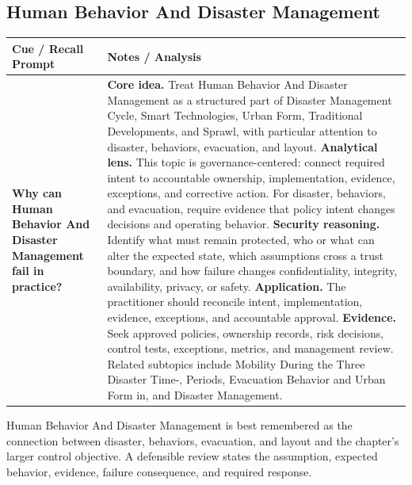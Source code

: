 \documentclass[11pt]{article}
\newcommand{\CornellHeader}{%
\rowcolor{Navy}\color{white}\bfseries Cue / Recall Prompt & \color{white}\bfseries Notes / Analysis\\\hline}
\newcommand{\CornellRow}[2]{%
\cellcolor{CueGray}\RaggedRight\textbf{#1} & \RaggedRight #2\\\hline}
\begin{document}
\subsection*{Human Behavior And Disaster Management}
\begin{longtable}{>{\RaggedRight\arraybackslash}p{}|>{\RaggedRight\arraybackslash}p{}}
\CornellHeader
\CornellRow{Why can Human Behavior And Disaster Management fail in practice?}{\textbf{Core idea.} Treat Human Behavior And Disaster Management as a structured part of Disaster Management Cycle, Smart Technologies, Urban Form, Traditional Developments, and Sprawl, with particular attention to disaster, behaviors, evacuation, and layout. \textbf{Analytical lens.} This topic is governance-centered: connect required intent to accountable ownership, implementation, evidence, exceptions, and corrective action. For disaster, behaviors, and evacuation, require evidence that policy intent changes decisions and operating behavior. \textbf{Security reasoning.} Identify what must remain protected, who or what can alter the expected state, which assumptions cross a trust boundary, and how failure changes confidentiality, integrity, availability, privacy, or safety. \textbf{Application.} The practitioner should reconcile intent, implementation, evidence, exceptions, and accountable approval. \textbf{Evidence.} Seek approved policies, ownership records, risk decisions, control tests, exceptions, metrics, and management review. Related subtopics include Mobility During the Three Disaster Time-, Periods, Evacuation Behavior and Urban Form in, and Disaster Management.}
\end{longtable}
\begin{topicsummary}
Human Behavior And Disaster Management is best remembered as the connection between disaster, behaviors, evacuation, and layout and the chapter's larger control objective. A defensible review states the assumption, expected behavior, evidence, failure consequence, and required response.
\end{topicsummary}
\end{document}
